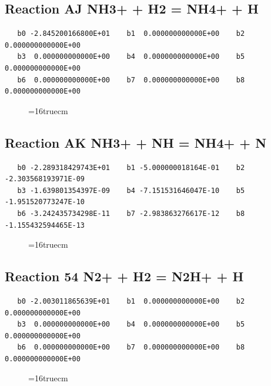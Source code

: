 \documentclass[12pt,dvipdfm]{article}
\begin{document}
\subsection{
Reaction AJ NH3+ + H2 = NH4+ + H}
\begin{small}\begin{verbatim}
   b0 -2.845200166800E+01    b1  0.000000000000E+00    b2  0.000000000000E+00
   b3  0.000000000000E+00    b4  0.000000000000E+00    b5  0.000000000000E+00
   b6  0.000000000000E+00    b7  0.000000000000E+00    b8  0.000000000000E+00
   \end{verbatim}\end{small}
\begin{figure}[h!]
\label{n2rates}
\epsfxsize=16truecm
\end{figure}
\newpage

\subsection{
Reaction AK NH3+ + NH = NH4+ + N}
\begin{small}\begin{verbatim}
   b0 -2.289318429743E+01    b1 -5.000000018164E-01    b2 -2.303568193971E-09
   b3 -1.639801354397E-09    b4 -7.151531646047E-10    b5 -1.951520773247E-10
   b6 -3.242435734298E-11    b7 -2.983863276617E-12    b8 -1.155432594465E-13
   \end{verbatim}\end{small}
\begin{figure}[h!]
\label{n2rates}
\epsfxsize=16truecm
\end{figure}
\newpage

\subsection{
Reaction 54 N2+ + H2 = N2H+ + H}
\begin{small}\begin{verbatim}
   b0 -2.003011865639E+01    b1  0.000000000000E+00    b2  0.000000000000E+00
   b3  0.000000000000E+00    b4  0.000000000000E+00    b5  0.000000000000E+00
   b6  0.000000000000E+00    b7  0.000000000000E+00    b8  0.000000000000E+00
   \end{verbatim}\end{small}
\begin{figure}[h!]
\label{n2rates}
\epsfxsize=16truecm
\end{figure}
\newpage
\end{document}
